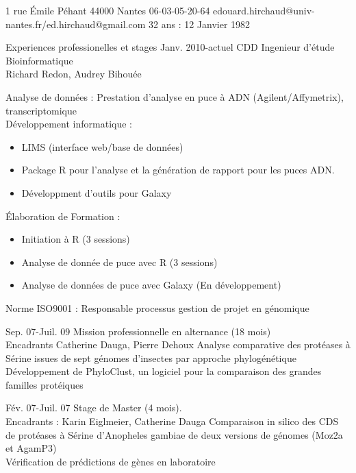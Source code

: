 \documentclass[a4paper, 11pt]{article}
\begin{document}
 


{1 rue Émile Péhant} 
{44000 Nantes} 
{06-03-05-20-64} 
{edouard.hirchaud@univ-nantes.fr/ed.hirchaud@gmail.com} 
{32 ans : 12 Janvier 1982} 




\Summary{ }
 
\begin{Section}{Experiences professionelles et stages}
{Janv. 2010-actuel}
{CDD Ingenieur d'étude Bioinformatique\\ Richard Redon, Audrey Bihouée}
{Analyse de données : Prestation d'analyse en puce à ADN (Agilent/Affymetrix), transcriptomique\\
	Développement informatique : 
	\begin{itemize}
		\item LIMS (interface web/base de données)
		\item Package R pour l'analyse et la génération de rapport pour les puces ADN.
		\item Développment d'outils pour Galaxy
	\end{itemize}
	Élaboration de Formation : \begin{itemize}
		\item Initiation à R (3 sessions)
		\item	Analyse de donnée de puce avec R (3 sessions)
		\item 	Analyse de données de puce avec Galaxy (En développement)
	\end{itemize}
	Norme ISO9001 : Responsable processus gestion de projet en génomique
}

{Sep. 07-Juil. 09}
{Mission professionnelle en alternance (18 mois) \\ Encadrants Catherine Dauga, Pierre Dehoux}
{Analyse comparative des protéases à Sérine issues de sept génomes d'insectes par approche phylogénétique
 \\
 Développement de PhyloClust, un logiciel pour la comparaison des grandes familles protéiques}

{Fév. 07-Juil. 07} 
{Stage de Master (4 mois). \\  Encadrants : Karin Eiglmeier, Catherine Dauga} 
{Comparaison in silico des CDS de protéases à Sérine d'Anopheles gambiae de deux versions de génomes (Moz2a et AgamP3)\\
Vérification de prédictions de gènes en laboratoire}

\end{Section}
\end{document}
